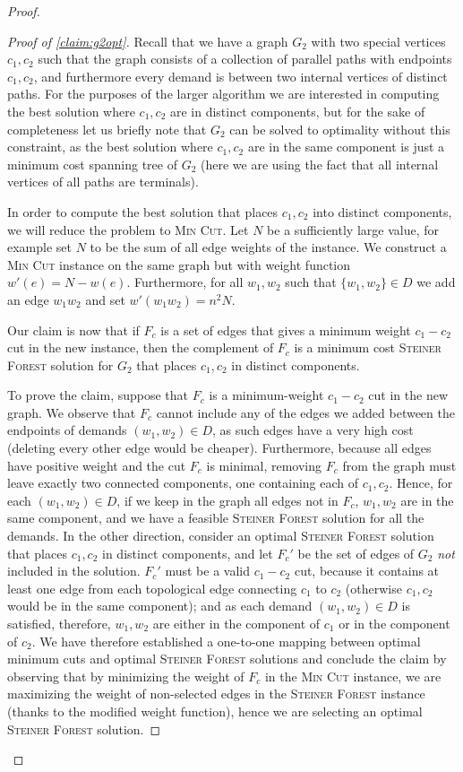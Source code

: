\documentclass[a4paper]{article}
\theoremstyle{plain}
\newcommand{\pname}[1]{\textsc{#1}}
\newcommand{\SF}{\pname{Steiner Forest}\xspace}
\begin{document}
\begin{proof}
\begin{proof}[Proof of \cref{claim:g2opt}]
Recall that we have a graph $G_2$ with two special vertices $c_1,c_2$ such that
the graph consists of a collection of parallel paths with endpoints $c_1,c_2$,
and furthermore every demand is between two internal vertices of distinct
paths. For the purposes of the larger algorithm we are interested in computing
the best solution where $c_1,c_2$ are in distinct components, but for the sake
of completeness let us briefly note that $G_2$ can be solved to optimality
without this constraint, as the best solution where $c_1,c_2$ are in the same
component is just a minimum cost spanning tree of $G_2$ (here we are using the
fact that all internal vertices of all paths are terminals).

In order to compute the best solution that places $c_1,c_2$ into distinct
components, we will reduce the problem to \textsc{Min Cut}. Let $N$ be a
sufficiently large value, for example set $N$ to be the sum of all edge weights
of the instance. We construct a \textsc{Min Cut} instance on the same graph but
with weight function $w'(e)=N-w(e)$. Furthermore, for all $w_1,w_2$ such that
$\{w_1,w_2\}\in D$ we add an edge $w_1w_2$ and set $w'(w_1w_2)=n^2N$.

Our claim is now that if $F_c$ is a set of edges that gives a minimum weight
$c_1-c_2$ cut in the new instance, then the complement of $F_c$ is a minimum
cost \SF solution for $G_2$ that places $c_1,c_2$ in distinct components.

To prove the claim, suppose that $F_c$ is a minimum-weight $c_1-c_2$ cut in the
new graph. We observe that $F_c$ cannot include any of the edges we added
between the endpoints of demands $(w_1,w_2)\in D$, as such edges have a very
high cost (deleting every other edge would be cheaper). Furthermore, because
all edges have positive weight and the cut $F_c$ is minimal, removing $F_c$
from the graph must leave exactly two connected components, one containing each
of $c_1,c_2$. Hence, for each $(w_1,w_2)\in D$, if we keep in the graph all
edges not in $F_c$, $w_1,w_2$ are in the same component, and we have a feasible
\SF solution for all the demands. In the other direction, consider an optimal
\SF solution that places $c_1,c_2$ in distinct components, and let $F_c'$ be
the set of edges of $G_2$ \emph{not} included in the solution. $F_c'$ must be a
valid $c_1-c_2$ cut, because it contains at least one edge from each
topological edge connecting $c_1$ to $c_2$ (otherwise $c_1,c_2$ would be in the
same component); and as each demand $(w_1,w_2)\in D$ is satisfied, therefore,
$w_1,w_2$ are either in the component of $c_1$ or in the component of $c_2$. We
have therefore established a one-to-one mapping between optimal minimum cuts
and optimal \SF solutions and conclude the claim by observing that by
minimizing the weight of $F_c$ in the \textsc{Min Cut} instance, we are
maximizing the weight of non-selected edges in the \SF instance (thanks to the
modified weight function), hence we are selecting an optimal \SF solution.
\end{proof}
%

\end{proof}





\newpage
\appendix
\end{document}

